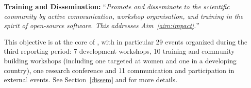\begin{compactenum}[\bf {Obj} 1\rm]
\item \label{objective:disseminate}
  \textbf{Training and Dissemination:}
  ``\emph{Promote and disseminate
    \ODK to the scientific community by active communication,
    workshop organisation, and training in the spirit of open-source
    software. This addresses Aim~\ref{aim:impact}.}''

  This objective is at the core of , with in particular
  29 events organized during the third reporting period: 7 development workshops, 10 training and community building
  workshops (including one targeted at women and one in a developing
  country), one research conference 
  and 11 communication and participation in external events. See
  Section~\ref{dissem} and  for more
  details.
\end{compactenum}


